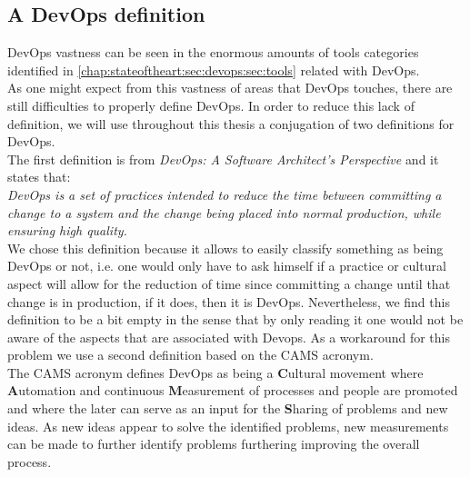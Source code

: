         \subsection{A DevOps definition} \label{chap:stateoftheart:sec:devops:sec:definition}
        DevOps vastness can be seen in the enormous amounts of tools categories identified in \ref{chap:stateoftheart:sec:devops:sec:tools} related with DevOps.\\
        As one might expect from this vastness of areas that DevOps touches, there are still difficulties to properly define DevOps. In order to reduce this lack of definition, we will use throughout this thesis a conjugation of two definitions for DevOps.\\
        The first definition is from \textit{DevOps: A Software Architect's Perspective} \cite{Bass} and it states that: \\
        \textit{DevOps is a set of practices intended to reduce the time between committing a change to a system and the change being placed into normal production, while ensuring high quality.} \\
        We chose this definition because it allows to easily classify something as being DevOps or not, i.e. one would only have to ask himself if a practice or cultural aspect will allow for the reduction of time since committing a change until that change is in production, if it does, then it is DevOps. Nevertheless, we find this definition to be a bit empty in the sense that by only reading it one would not be aware of the aspects that are associated with Devops. As a workaround for this problem we use a second definition based on the CAMS acronym.\\
        The CAMS acronym \cite{Willis2010} defines DevOps as being a \textbf{C}ultural movement where \textbf{A}utomation and continuous \textbf{M}easurement of processes and people are promoted and where the later can serve as an input for the \textbf{S}haring of problems and new ideas. As new ideas appear to solve the identified problems, new measurements can be made to further identify problems furthering improving the overall process.

